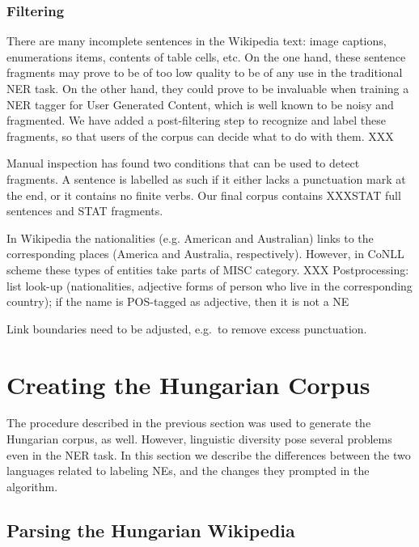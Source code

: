 \documentclass[11pt]{article}
\begin{document}
\subsubsection{Filtering}

There are many incomplete sentences in the Wikipedia text: image captions, enumerations items, contents of table cells, etc. On the one hand, these sentence fragments may prove to be of too low quality to be of any use in the traditional NER task. On the other hand, they could prove to be invaluable when training a NER tagger for User Generated Content, which is well known to be noisy and fragmented. We have added a post-filtering step to recognize and label these fragments, so that users of the corpus can decide what to do with them. XXX

Manual inspection has found two conditions that can be used to detect fragments. A sentence is labelled as such if it either lacks a punctuation mark at the end, or it contains no finite verbs. Our final corpus contains XXXSTAT full sentences and STAT fragments.

In Wikipedia the nationalities (e.g. American and Australian) links to the corresponding places (America and Australia, respectively). However, in CoNLL scheme these types of entities take parts of MISC category. XXX Postprocessing: list look-up (nationalities, adjective forms of person who live in the corresponding country); if the name is POS-tagged as adjective, then it is not a NE

Link boundaries need to be adjusted, e.g.~to remove excess punctuation.

\section{Creating the Hungarian Corpus}
\label{sec:hun}

The procedure described in the previous section was used to generate the Hungarian corpus, as well. However, linguistic diversity pose several problems even in the NER task. In this section we describe the differences between the two languages related to labeling NEs, and the changes they prompted in the algorithm.

\subsection{Parsing the Hungarian Wikipedia}
\end{document}
